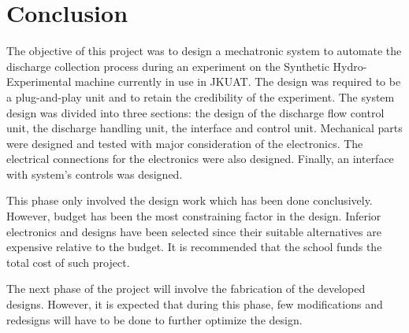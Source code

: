 \section{Conclusion}
\par
The objective of this project was to design a mechatronic system to automate the discharge collection process during an experiment on the Synthetic Hydro-Experimental machine currently in use in JKUAT. The design was required to be a plug-and-play unit and to retain the credibility of the experiment. The system design was divided into three sections: the design of the discharge flow control unit, the discharge handling unit, the interface and control unit. Mechanical parts were designed and tested with major consideration of the electronics. The electrical connections for the electronics were also designed. Finally, an interface with system's controls was designed.  
\par
This phase only involved the design work which has been done conclusively. However, budget has been the most constraining factor in the design. Inferior electronics and designs have been selected since their suitable alternatives are expensive relative to the budget. It is recommended that the school funds the total cost of such project.  
\par
The next phase of the project will involve the fabrication of the developed designs. However, it is expected that during this phase, few modifications and redesigns will have to be done to further optimize the design.
